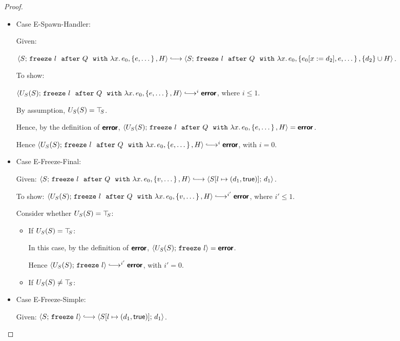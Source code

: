\begin{proof}
\begin{itemize}
  \item Case {\sc E-Spawn-Handler}:

    Given:

    $\config{S}{\freezeafterfull{l}{Q}{\lam{x}{e_0}}{\setof{e,
          \dots}}{H}} \parstepsto
    \config{S}{\freezeafterfull{l}{Q}{\lam{x}{e_0}}{\setof{\subst{e_0}{x}{d_2},
          e, \dots}}{\{d_2\}\cup H}}$.

    To show:

    $\config{U_S(S)}{\freezeafterfull{l}{Q}{\lam{x}{e_0}}{\setof{e,
          \dots}}{H}} \parstepsto^i \error$, where $i \leq 1$.

    By assumption, $U_S(S) = \top\hspace{-0.85mm}_{S}$.

    Hence, by the definition of $\textbf{\textsf{error}}$,
    $\langle U_S(S);\, \mbox{\texttt{freeze}}~l~~{\mbox{\texttt{after}}}~Q~~{\mbox{\texttt{with}}}~\lambda x.\,e_0, \left\{e,
          \dots\right\}, H \rangle = \textbf{\textsf{error}}$.

    Hence
    $\config{U_S(S)}{\freezeafterfull{l}{Q}{\lam{x}{e_0}}{\setof{e,
          \dots}}{H}} \parstepsto^i \error$, with $i = 0$.

  \item Case {\sc E-Freeze-Final}:

    Given:
    $\config{S}{\freezeafterfull{l}{Q}{\lam{x}{e_0}}{\setof{v,
          \dots}}{H}} \parstepsto
    \config{\extS{S}{l}{d_1}{\frozentrue}}{d_1}$.

    To show:
    $\config{U_S(S)}{\freezeafterfull{l}{Q}{\lam{x}{e_0}}{\setof{v,
          \dots}}{H}} \parstepsto^{i'} \error$, where $i' \leq 1$.

    Consider whether $U_S(S) = \top\hspace{-0.85mm}_{S}$:
    \begin{itemize}

    \item If $U_S(S) = \top\hspace{-0.85mm}_{S}$:

      In this case, by the definition of $\textbf{\textsf{error}}$,
      $\langle U_S(S);\, \mbox{\texttt{freeze}}~l \rangle = \textbf{\textsf{error}}$.

      Hence $\config{U_S(S)}{\freeze{l}}
      \parstepsto^{i'} \error$, with $i' = 0$.

    \item If $U_S(S) \neq \top\hspace{-0.85mm}_{S}$:


    \end{itemize}

  \item Case {\sc E-Freeze-Simple}:

    Given: $\config{S}{\freeze{l}} \parstepsto
    \config{\extS{S}{l}{d_1}{\frozentrue}}{d_1}$.


\end{itemize}
\end{proof}
